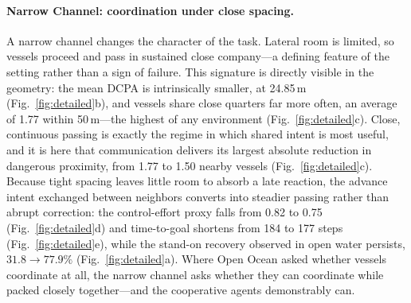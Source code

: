 \documentclass[final,5p,times,twocolumn]{elsarticle}
\begin{document}
{\paragraph{Narrow Channel: coordination under close spacing.}
A narrow channel changes the character of the task. Lateral room is limited, so vessels proceed and pass in sustained close company---a defining feature of the setting rather than a sign of failure. This signature is directly visible in the geometry: the mean DCPA is intrinsically smaller, at 24.85\,m (Fig.~\ref{fig:detailed}b), and vessels share close quarters far more often, an average of 1.77 within 50\,m---the highest of any environment (Fig.~\ref{fig:detailed}c). Close, continuous passing is exactly the regime in which shared intent is most useful, and it is here that communication delivers its largest absolute reduction in dangerous proximity, from 1.77 to 1.50 nearby vessels (Fig.~\ref{fig:detailed}c). Because tight spacing leaves little room to absorb a late reaction, the advance intent exchanged between neighbors converts into steadier passing rather than abrupt correction: the control-effort proxy falls from 0.82 to 0.75 (Fig.~\ref{fig:detailed}d) and time-to-goal shortens from 184 to 177 steps (Fig.~\ref{fig:detailed}e), while the stand-on recovery observed in open water persists, $31.8 \rightarrow 77.9\%$ (Fig.~\ref{fig:detailed}a). Where Open Ocean asked whether vessels coordinate at all, the narrow channel asks whether they can coordinate while packed closely together---and the cooperative agents demonstrably can.

}
\end{document}
